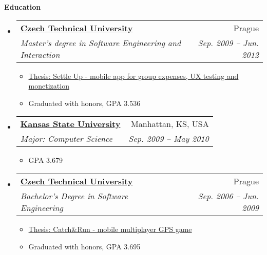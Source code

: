 \documentclass[letterpaper,11pt]{article}
\makeatletter
\newcommand{\resitem}[1]{\item #1 \vspace{-2pt}}
\newcommand{\resheading}[1]{{\large \colorbox{mygrey}{\begin{minipage}{\textwidth}{\textbf{#1 \vphantom{p\^{E}}}}\end{minipage}}}}
\newcommand{\ressubheading}[4]{
\begin{tabular*}{6.5in}{l@{\extracolsep{\fill}}r}
		\textbf{#1} & #2 \\
		\textit{#3} & \textit{#4} \\
\end{tabular*}\vspace{-6pt}}
\makeatother
\begin{document}
\resheading{Education}
	\begin{itemize}
		\item
			\ressubheading{\href{http://www.cvut.cz/en?set_language=en}{Czech Technical University}}{Prague}{Master's degree in Software Engineering and Interaction}{Sep. 2009 -- Jun. 2012}
				{ \footnotesize
				\begin{itemize}
					\resitem{\href{http://www.settleup.info/files/master-thesis-david-vavra.pdf}{Thesis: Settle Up - mobile app for group expenses, UX testing and monetization}}
					\resitem{Graduated with honors, GPA 3.536}
				\end{itemize}
				}
		\item
			\ressubheading{\href{http://www.k-state.edu}{Kansas State University}}{Manhattan, KS, USA}{Major: Computer Science}{Sep. 2009 -- May 2010}
{ \footnotesize
				\begin{itemize}
					\resitem{GPA 3.679}
				\end{itemize}
				}
		\item   															%
			\ressubheading{\href{http://www.cvut.cz/en?set_language=en}{Czech Technical University}}{Prague}{Bachelor's Degree in Software Engineering}{Sep. 2006 -- Jun. 2009}
				{ \footnotesize
				\begin{itemize}
					\resitem{\href{http://www.destil.cz/bachelor-thesis-david-vavra.pdf}{Thesis: Catch\&Run - mobile multiplayer GPS game}}
					\resitem{Graduated with honors, GPA 3.695}
				\end{itemize}
				}
	\end{itemize} %
	
\end{document}
